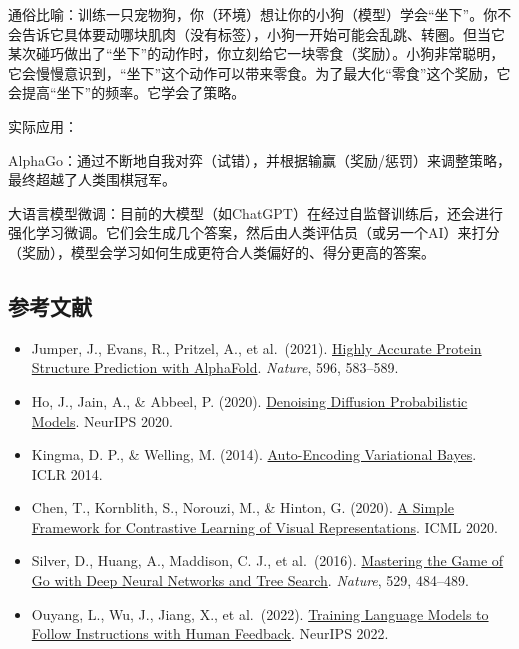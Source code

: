 通俗比喻：训练一只宠物狗，你（环境）想让你的小狗（模型）学会``坐下''。你不会告诉它具体要动哪块肌肉（没有标签），小狗一开始可能会乱跳、转圈。但当它某次碰巧做出了``坐下''的动作时，你立刻给它一块零食（奖励）。小狗非常聪明，它会慢慢意识到，``坐下''这个动作可以带来零食。为了最大化``零食''这个奖励，它会提高``坐下''的频率。它学会了策略。

实际应用：

AlphaGo：通过不断地自我对弈（试错），并根据输赢（奖励/惩罚）来调整策略，最终超越了人类围棋冠军。

大语言模型微调：目前的大模型（如ChatGPT）在经过自监督训练后，还会进行强化学习微调。它们会生成几个答案，然后由人类评估员（或另一个AI）来打分（奖励），模型会学习如何生成更符合人类偏好的、得分更高的答案。

\hypertarget{ux53c2ux8003ux6587ux732e}{%
\subsection{参考文献}\label{ux53c2ux8003ux6587ux732e}}

\vspace{0.25em}
\begin{itemize}
\tightlist
\item
  Jumper, J., Evans, R., Pritzel, A., et al.~(2021). \href{https://www.nature.com/articles/s41586-021-03819-2}{Highly Accurate Protein Structure Prediction with AlphaFold}. \emph{Nature}, 596, 583--589.
\item
  Ho, J., Jain, A., \& Abbeel, P. (2020). \href{https://proceedings.neurips.cc/paper/2020/hash/4c5bcfec8584af0d967f1ab10179ca4b-Abstract.html}{Denoising Diffusion Probabilistic Models}. NeurIPS 2020.
\item
  Kingma, D. P., \& Welling, M. (2014). \href{https://arxiv.org/abs/1312.6114}{Auto-Encoding Variational Bayes}. ICLR 2014.
\item
  Chen, T., Kornblith, S., Norouzi, M., \& Hinton, G. (2020). \href{https://proceedings.mlr.press/v119/chen20j.html}{A Simple Framework for Contrastive Learning of Visual Representations}. ICML 2020.
\item
  Silver, D., Huang, A., Maddison, C. J., et al.~(2016). \href{https://doi.org/10.1038/nature16961}{Mastering the Game of Go with Deep Neural Networks and Tree Search}. \emph{Nature}, 529, 484--489.
\item
  Ouyang, L., Wu, J., Jiang, X., et al.~(2022). \href{https://arxiv.org/abs/2203.02155}{Training Language Models to Follow Instructions with Human Feedback}. NeurIPS 2022.
\end{itemize}

